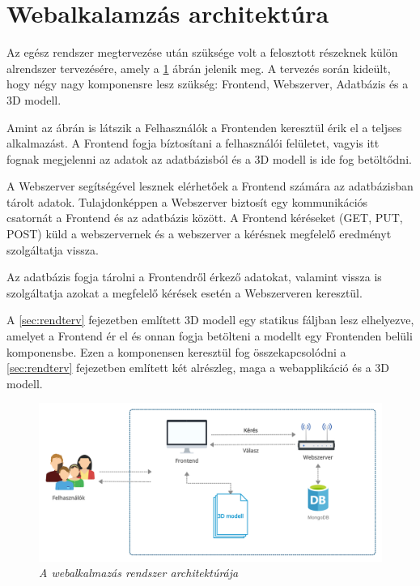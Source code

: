 \section{Webalkalamzás architektúra}
\label{sec:webterv}

Az egész rendszer megtervezése után szüksége volt a felosztott részeknek külön alrendszer tervezésére, amely a \ref{fig:systemArchLittle} ábrán jelenik meg. A tervezés során kideült, hogy négy nagy komponensre lesz szükség: Frontend, Webszerver, Adatbázis és a 3D modell.

Amint az ábrán is látszik a Felhasználók a Frontenden keresztül érik el a teljses alkalmazást. A Frontend fogja bíztosítani a felhasználói felületet, vagyis itt fognak megjelenni az adatok az adatbázisból és a 3D modell is ide fog betöltődni.

A Webszerver segítségével lesznek elérhetőek a Frontend számára az adatbázisban tárolt adatok. Tulajdonképpen a Webszerver biztosít egy kommunikációs csatornát a Frontend és az adatbázis között. A Frontend kéréseket (GET, PUT, POST) küld a webszervernek és a webszerver a kérésnek megfelelő eredményt szolgáltatja vissza.

Az adatbázis fogja tárolni a Frontendről érkező adatokat, valamint vissza is szolgáltatja azokat a megfelelő kérések esetén a Webszerveren keresztül.

A  \ref{sec:rendterv} fejezetben említett 3D modell egy statikus fáljban lesz elhelyezve, amelyet a Frontend ér el és onnan fogja betölteni a modellt egy Frontenden belüli komponensbe. Ezen a komponensen keresztül fog összekapcsolódni a \ref{sec:rendterv} fejezetben említett két alrészleg, maga a webapplikáció és a 3D modell.
\begin{figure}[H]
	\centering
	\includegraphics[width=1\linewidth]{figures/images/webalkalmazasarchitect.png}
	\caption[A webalkalmazás rendszer architektúrája]{\textit{A webalkalmazás rendszer architektúrája}}
	\label{fig:systemArchLittle}
\end{figure}